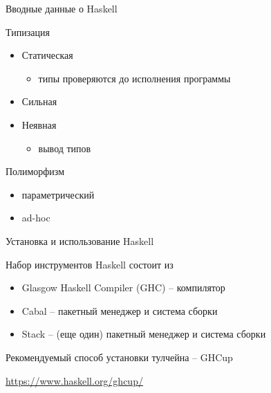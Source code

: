 \documentclass{beamer}
\begin{document}
  \begin{frame}{Вводные данные о Haskell}
      \begin{block}{Типизация}
          \begin{itemize}
              \item Статическая
                \begin{itemize}
                    \item типы проверяются до исполнения программы
                \end{itemize}
              \item Сильная
              \item Неявная
                \begin{itemize}
                    \item вывод типов
                \end{itemize}
          \end{itemize}
      \end{block}
      \begin{block}{Полиморфизм}
        \begin{itemize}
            \item параметрический
            \item ad-hoc
        \end{itemize}
      \end{block}
  \end{frame}
  \begin{frame}{Установка и использование Haskell}
      \begin{block}{Набор инструментов Haskell состоит из}
\begin{itemize}
    \item Glasgow Haskell Compiler (GHC) -- компилятор
    \item Cabal -- пакетный менеджер и система сборки
    \item Stack -- (еще один) пакетный менеджер и система сборки
\end{itemize}
      \end{block}
      \begin{block}{Рекомендуемый способ установки тулчейна -- GHCup}
        
        \center\alert{{\url{https://www.haskell.org/ghcup/}}}
      \end{block}
  \end{frame}
\end{document}
